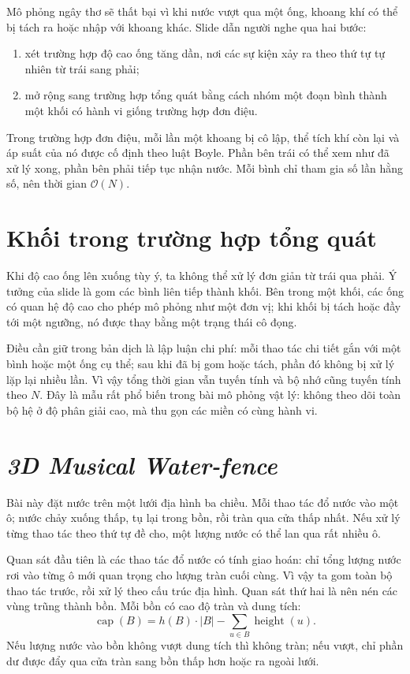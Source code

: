 \documentclass[11pt]{article}
\newcommand{\Oh}{\mathcal{O}}
\begin{document}
Mô phỏng ngây thơ sẽ thất bại vì khi nước vượt qua một ống, khoang khí có thể
bị tách ra hoặc nhập với khoang khác. Slide dẫn người nghe qua hai bước:
\begin{enumerate}
  \item xét trường hợp độ cao ống tăng dần, nơi các sự kiện xảy ra theo thứ
  tự tự nhiên từ trái sang phải;
  \item mở rộng sang trường hợp tổng quát bằng cách nhóm một đoạn bình thành
  một khối có hành vi giống trường hợp đơn điệu.
\end{enumerate}

Trong trường hợp đơn điệu, mỗi lần một khoang bị cô lập, thể tích khí còn lại
và áp suất của nó được cố định theo luật Boyle. Phần bên trái có thể xem như
đã xử lý xong, phần bên phải tiếp tục nhận nước. Mỗi bình chỉ tham gia số lần
hằng số, nên thời gian \(\Oh(N)\).

\section{Khối trong trường hợp tổng quát}

Khi độ cao ống lên xuống tùy ý, ta không thể xử lý đơn giản từ trái qua phải.
Ý tưởng của slide là gom các bình liên tiếp thành khối. Bên trong một khối,
các ống có quan hệ độ cao cho phép mô phỏng như một đơn vị; khi khối bị tách
hoặc đầy tới một ngưỡng, nó được thay bằng một trạng thái cô đọng.

Điều cần giữ trong bản dịch là lập luận chi phí: mỗi thao tác chi tiết gắn với
một bình hoặc một ống cụ thể; sau khi đã bị gom hoặc tách, phần đó không bị
xử lý lặp lại nhiều lần. Vì vậy tổng thời gian vẫn tuyến tính và bộ nhớ cũng
tuyến tính theo \(N\). Đây là mẫu rất phổ biến trong bài mô phỏng vật lý:
không theo dõi toàn bộ hệ ở độ phân giải cao, mà thu gọn các miền có cùng hành
vi.

\section{\textit{3D Musical Water-fence}}

Bài này đặt nước trên một lưới địa hình ba chiều. Mỗi thao tác đổ nước vào một
ô; nước chảy xuống thấp, tụ lại trong bồn, rồi tràn qua cửa thấp nhất. Nếu xử
lý từng thao tác theo thứ tự đề cho, một lượng nước có thể lan qua rất nhiều ô.

Quan sát đầu tiên là các thao tác đổ nước có tính giao hoán: chỉ tổng lượng
nước rơi vào từng ô mới quan trọng cho lượng tràn cuối cùng. Vì vậy ta gom
toàn bộ thao tác trước, rồi xử lý theo cấu trúc địa hình. Quan sát thứ hai là
nên nén các vùng trũng thành bồn. Mỗi bồn có cao độ tràn và dung tích:
\[
  \operatorname{cap}(B)=h(B)\cdot |B|-\sum_{u\in B}\operatorname{height}(u).
\]
Nếu lượng nước vào bồn không vượt dung tích thì không tràn; nếu vượt, chỉ phần
dư được đẩy qua cửa tràn sang bồn thấp hơn hoặc ra ngoài lưới.
\end{document}
